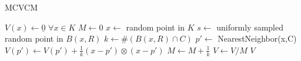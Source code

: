 \documentclass{article}
\begin{document}
\begin{algorithm}
\caption{MCVCM}\label{alg:vcm}
\begin{algorithmic}[1]
\State $V(x) \gets \underline{0}$  $\forall x \in K$ 
\State $M \gets 0$
    \State $x \gets$ random point in $K$
    \State $s \gets$ uniformly sampled random point in $B(x,R)$
    \State $k \gets \#(B(x,R) \cap C)$ 
    \State $p' \gets$ NearestNeighbor(x,C)
    \State $V(p') \gets V(p') + \frac{1}{k}(x-p')\otimes(x-p')$
    \State $M \gets M + \frac{1}{k}$ 
\EndFor
\State $V \gets V / M$
\State \Return $V$
\EndFunction
\end{algorithmic}
\end{algorithm}
\end{document}
